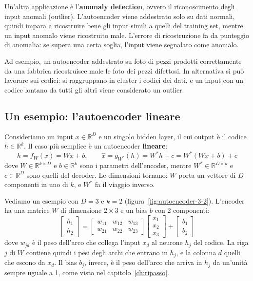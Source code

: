 Un'altra applicazione è l'\textbf{anomaly detection}, ovvero il riconoscimento degli input anomali (outlier). L'autoencoder viene addestrato solo su dati normali, quindi impara a ricostruire bene gli input simili a quelli del training set, mentre un input anomalo viene ricostruito male. L'errore di ricostruzione fa da punteggio di anomalia: se supera una certa soglia, l'input viene segnalato come anomalo.

Ad esempio, un autoencoder addestrato su foto di pezzi prodotti correttamente da una fabbrica ricostruisce male le foto dei pezzi difettosi. In alternativa si può lavorare sui codici: si raggruppano in cluster i codici dei dati, e un input con un codice lontano da tutti gli altri viene considerato un outlier.

\subsection{Un esempio: l'autoencoder lineare}\label{sec:autoencoder-lineare}
Consideriamo un input $x \in \mathbb{R}^D$ e un singolo hidden layer, il cui output è il codice $h \in \mathbb{R}^k$. Il caso più semplice è un autoencoder \textbf{lineare}:
\[
    h = f_W(x) = Wx + b, \qquad \hat{x} = g_{W^*}(h) = W^*h + c = W^*(Wx + b) + c
\]
dove $W \in \mathbb{R}^{k \times D}$ e $b \in \mathbb{R}^{k}$ sono i parametri dell'encoder, mentre $W^* \in \mathbb{R}^{D \times k}$ e $c \in \mathbb{R}^{D}$ sono quelli del decoder. Le dimensioni tornano: $W$ porta un vettore di $D$ componenti in uno di $k$, e $W^*$ fa il viaggio inverso.

Vediamo un esempio con $D = 3$ e $k = 2$ (figura~\ref{fig:autoencoder-3-2}). L'encoder ha una matrice $W$ di dimensione $2 \times 3$ e un bias $b$ con 2 componenti:
\[
    \begin{bmatrix} h_1 \\ h_2 \end{bmatrix} =
    \begin{bmatrix} w_{11} & w_{12} & w_{13} \\ w_{21} & w_{22} & w_{23} \end{bmatrix}
    \begin{bmatrix} x_1 \\ x_2 \\ x_3 \end{bmatrix} +
    \begin{bmatrix} b_1 \\ b_2 \end{bmatrix}
\]
dove $w_{jd}$ è il peso dell'arco che collega l'input $x_d$ al neurone $h_j$ del codice. La riga $j$ di $W$ contiene quindi i pesi degli archi che entrano in $h_j$, e la colonna $d$ quelli che escono da $x_d$. Il bias $b_j$, invece, è il peso dell'arco che arriva in $h_j$ da un'unità sempre uguale a 1, come visto nel capitolo~\ref{ch:ripasso}.

